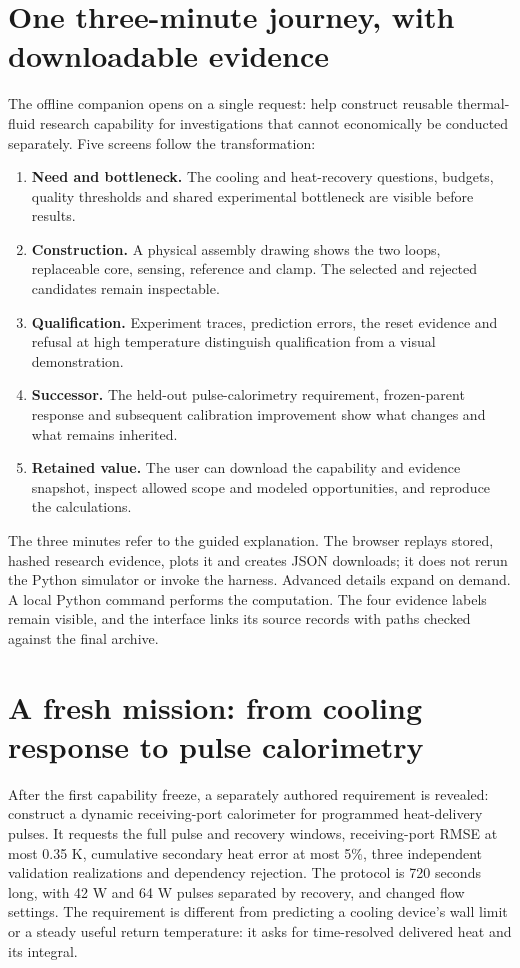 \documentclass[11pt,letterpaper]{article}
\begin{document}
\section{One three-minute journey, with downloadable evidence}
The offline companion opens on a single request: help construct reusable thermal-fluid research capability for investigations that cannot economically be conducted separately. Five screens follow the transformation:
\begin{enumerate}
\item \textbf{Need and bottleneck.} The cooling and heat-recovery questions, budgets, quality thresholds and shared experimental bottleneck are visible before results.
\item \textbf{Construction.} A physical assembly drawing shows the two loops, replaceable core, sensing, reference and clamp. The selected and rejected candidates remain inspectable.
\item \textbf{Qualification.} Experiment traces, prediction errors, the reset evidence and refusal at high temperature distinguish qualification from a visual demonstration.
\item \textbf{Successor.} The held-out pulse-calorimetry requirement, frozen-parent response and subsequent calibration improvement show what changes and what remains inherited.
\item \textbf{Retained value.} The user can download the capability and evidence snapshot, inspect allowed scope and modeled opportunities, and reproduce the calculations.
\end{enumerate}
The three minutes refer to the guided explanation. The browser replays stored, hashed research evidence, plots it and creates JSON downloads; it does not rerun the Python simulator or invoke the harness. Advanced details expand on demand. A local Python command performs the computation. The four evidence labels remain visible, and the interface links its source records with paths checked against the final archive.

\section{A fresh mission: from cooling response to pulse calorimetry}
\label{sec:transfer}
After the first capability freeze, a separately authored requirement is revealed: construct a dynamic receiving-port calorimeter for programmed heat-delivery pulses. It requests the full pulse and recovery windows, receiving-port RMSE at most 0.35 K, cumulative secondary heat error at most 5\%, three independent validation realizations and dependency rejection. The protocol is 720 seconds long, with 42 W and 64 W pulses separated by recovery, and changed flow settings. The requirement is different from predicting a cooling device's wall limit or a steady useful return temperature: it asks for time-resolved delivered heat and its integral.
\end{document}
